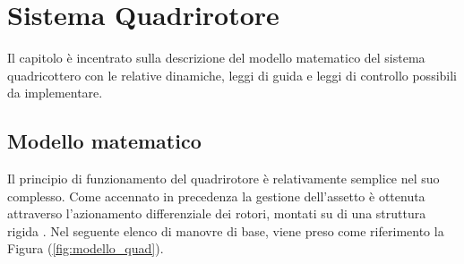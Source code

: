\chapter{Sistema Quadrirotore}
Il capitolo è incentrato sulla descrizione del modello matematico del sistema quadricottero con le relative dinamiche, leggi di guida e leggi di controllo possibili da implementare.
\section{Modello matematico}
Il principio di funzionamento del quadrirotore è relativamente semplice nel suo complesso. Come accennato in precedenza la gestione dell'assetto è ottenuta attraverso l'azionamento differenziale dei rotori, montati su di una struttura rigida \cite{modelquad}.
Nel seguente elenco di manovre di base, viene preso come riferimento la Figura (\ref{fig:modello_quad}).
